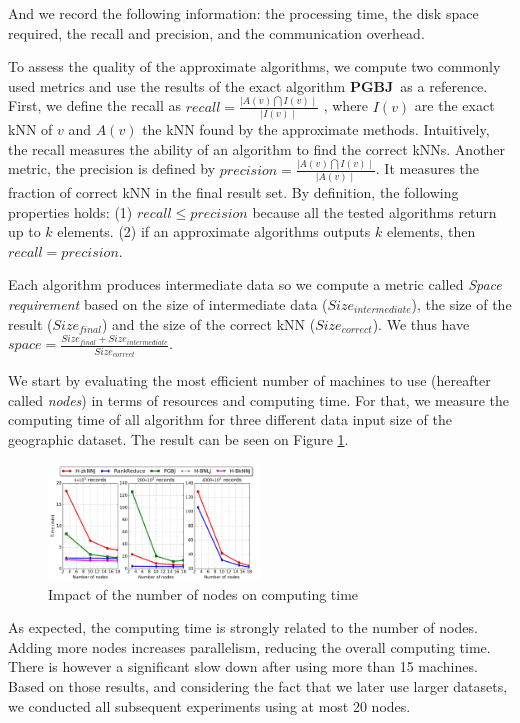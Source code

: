 \documentclass[10pt,journal,compsoc]{IEEEtran}
\newcommand{\VO}{{\bf PGBJ}}
\begin{document}
And we record the following information: the processing time, the disk space required, the recall and precision, and the communication overhead.

To assess the quality of the approximate algorithms, we compute two commonly used metrics and use the results of 
the exact algorithm \VO~as a reference. First, we define the recall as $ recall = \frac{\mid A(v) \bigcap I(v) 
\mid}{\mid  
I(v) \mid}$%
, where  $I(v)$ are the exact kNN of $v$ and $A(v)$ the kNN found 
by the approximate methods. Intuitively, the recall measures the ability of an algorithm to find the correct kNNs.
Another metric, the precision is defined by $precision =  \frac{\mid A(v) \bigcap I(v) \mid}{\mid  
A(v) \mid}$. It measures the fraction of correct kNN in the
final result set. By definition, the following properties holds: (1) $recall \leq precision$ because all the tested 
algorithms return up to $k$ elements. (2) if an approximate algorithms outputs $k$ elements, 
then  $ recall = precision$. 

Each algorithm produces intermediate data so we compute a metric called \emph{Space requirement} based on the size of
intermediate data ($Size_{intermediate}$), the size of the result ($Size_{final}$) and the size of the correct kNN 
($Size_{correct}$). We thus have $space = \frac{Size_{final}+Size_{intermediate}}{Size_{correct}}$.


We start by evaluating the most efficient number of machines to use (hereafter called \emph{nodes}) in terms of resources and computing 
time. For that, we measure the computing time of all algorithm for three different data input size of the geographic dataset.
The result can be seen on Figure \ref{fig:geo_data_nodes}.
\begin{figure}[!h]
 \centering
 \includegraphics[width=0.5\textwidth]{img-perf/geo/data/nodes.pdf}
 \caption{Impact of the number of nodes on computing time  \label{fig:geo_data_nodes}}
\end{figure}
As expected, the computing time is strongly related to the number of nodes. Adding more nodes increases parallelism, reducing the
overall computing time. There is however a significant slow down after using more than 15 machines. Based on those
results, and considering the fact that we later use larger datasets, we conducted all subsequent experiments using at 
most 20 nodes.
\end{document}
